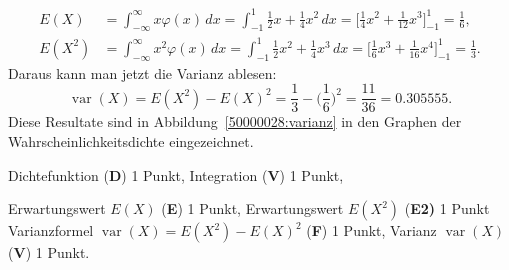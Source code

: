\begin{loesung}
\begin{teilaufgaben}
\begin{align*}
E(X)&=
\int_{-\infty}^\infty x\varphi(x)\,dx
=
\int_{-1}^{1}
\frac12x+\frac14x^2
\,dx
=
\biggl[
\frac14x^2+\frac1{12}x^3
\biggr]_{-1}^{1}
=\frac1{6},
\\
E(X^2)
&=
\int_{-\infty}^\infty x^2\varphi(x)\,dx
=
\int_{-1}^{1}
\frac12x^2+\frac14x^3
\,dx
=
\biggl[
\frac16x^3+\frac1{16}x^4
\biggr]_{-1}^{1}
=\frac1{3}.
\end{align*}
Daraus kann man jetzt die Varianz ablesen:
\[
\operatorname{var}(X) = E(X^2)-E(X)^2=\frac1{3}-\biggl(\frac1{6}\biggr)^2
=\frac{11}{36}=0.305555.
\]
Diese Resultate sind in Abbildung~\ref{50000028:varianz} in den Graphen
der Wahrscheinlichkeitsdichte eingezeichnet.
\qedhere
\end{teilaufgaben}
\end{loesung}

\begin{bewertung}
\begin{teilaufgaben}
\item Dichtefunktion ({\bf D}) 1 Punkt,
Integration ({\bf V}) 1 Punkt,
\item
Erwartungswert $E(X)$ ({\bf E}) 1 Punkt,
Erwartungswert $E(X^2)$ ({\bf E2)} 1 Punkt
Varianzformel $\operatorname{var}(X)=E(X^2)-E(X)^2$ ({\bf F}) 1 Punkt,
Varianz $\operatorname{var}(X)$ ({\bf V}) 1 Punkt.
\end{teilaufgaben}
\end{bewertung}


